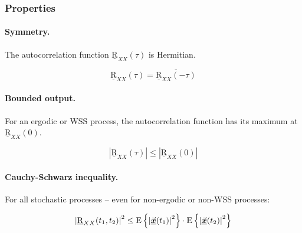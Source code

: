 \begin{refsection}
\subsubsection{Properties}

\paragraph{Symmetry.}

The autocorrelation function $\underline{\mathrm{R}}_{XX}(\tau)$ is Hermitian.

\begin{equation}
	\underline{\mathrm{R}}_{XX}(\tau) = \overline{\underline{\mathrm{R}}_{XX}(-\tau)}
	\label{eq:ch02:autocorr_hermitian}
\end{equation}

\paragraph{Bounded output.}

For an ergodic or \ac{WSS} process, the autocorrelation function has its maximum at $\underline{\mathrm{R}}_{XX}(0)$.

\begin{equation}
	\left|\underline{\mathrm{R}}_{XX}(\tau)\right| \leq \left|\underline{\mathrm{R}}_{XX}(0)\right|
\end{equation}

\paragraph{Cauchy-Schwarz inequality.}

For all stochastic processes -- even for non-ergodic or non-\acs{WSS} processes:

\begin{equation}
	\left|\underline{\mathrm{R}}_{XX}(t_1, t_2)\right|^2 \leq \mathrm{E}\left\{ \left|\vec{\bm{\underline{x}}}(t_1)\right|^2 \right\} \cdot \mathrm{E}\left\{ \left|\vec{\bm{\underline{x}}}(t_2)\right|^2 \right\}
\end{equation}


\end{refsection}
